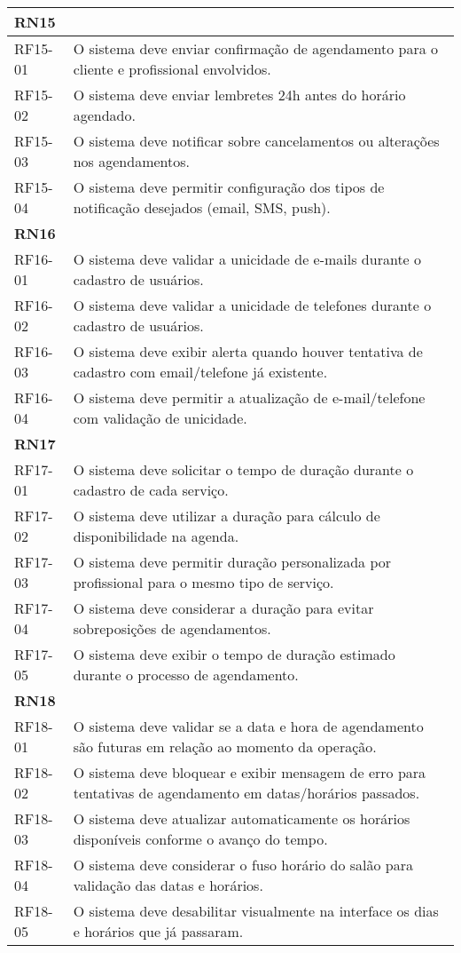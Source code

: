 \begin{longtable}{|p{}|p{}|}
	\multicolumn{2}{|l|}{\textbf{RN15}} \\ \hline
	RF15-01 & O sistema deve enviar confirmação de agendamento para o cliente e profissional envolvidos. \\ \hline
	RF15-02 & O sistema deve enviar lembretes 24h antes do horário agendado. \\ \hline
	RF15-03 & O sistema deve notificar sobre cancelamentos ou alterações nos agendamentos. \\ \hline
	RF15-04 & O sistema deve permitir configuração dos tipos de notificação desejados (email, SMS, push). \\ \hline
	
	\multicolumn{2}{|l|}{\textbf{RN16}} \\ \hline
	RF16-01 & O sistema deve validar a unicidade de e-mails durante o cadastro de usuários. \\ \hline
	RF16-02 & O sistema deve validar a unicidade de telefones durante o cadastro de usuários. \\ \hline
	RF16-03 & O sistema deve exibir alerta quando houver tentativa de cadastro com email/telefone já existente. \\ \hline
	RF16-04 & O sistema deve permitir a atualização de e-mail/telefone com validação de unicidade. \\ \hline
	
	\multicolumn{2}{|l|}{\textbf{RN17}} \\ \hline
	RF17-01 & O sistema deve solicitar o tempo de duração durante o cadastro de cada serviço. \\ \hline
	RF17-02 & O sistema deve utilizar a duração para cálculo de disponibilidade na agenda. \\ \hline
	RF17-03 & O sistema deve permitir duração personalizada por profissional para o mesmo tipo de serviço. \\ \hline
	RF17-04 & O sistema deve considerar a duração para evitar sobreposições de agendamentos. \\ \hline
	RF17-05 & O sistema deve exibir o tempo de duração estimado durante o processo de agendamento. \\ \hline
	
	\multicolumn{2}{|l|}{\textbf{RN18}} \\ \hline
	RF18-01 & O sistema deve validar se a data e hora de agendamento são futuras em relação ao momento da operação. \\ \hline
	RF18-02 & O sistema deve bloquear e exibir mensagem de erro para tentativas de agendamento em datas/horários passados. \\ \hline
	RF18-03 & O sistema deve atualizar automaticamente os horários disponíveis conforme o avanço do tempo. \\ \hline
	RF18-04 & O sistema deve considerar o fuso horário do salão para validação das datas e horários. \\ \hline
	RF18-05 & O sistema deve desabilitar visualmente na interface os dias e horários que já passaram. \\ \hline
	

\end{longtable}
